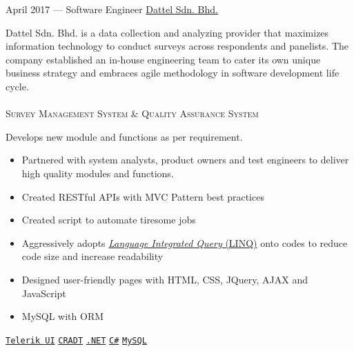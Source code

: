 \documentclass[9pt]{developercv} %
\begin{document}



\begin{entrylist}
	\entry
		{April 2017 ---}
		{Software Engineer}
		{\href{https://www.dattel.asia/}{Dattel Sdn. Bhd.}}
		{{\footnotesize{Dattel Sdn. Bhd. is a data collection and analyzing provider that maximizes information technology to conduct surveys across respondents and panelists. The company established an in-house engineering team to cater its own unique business strategy and embraces agile methodology in software development life cycle.}} 
\\ \\
		{\textsc{Survey Management System \& Quality Assurance System}} \\
			{\small Develops new module and functions as per requirement.
			\begin{itemize}
				\item Partnered with system analysts, product owners and test engineers to deliver high quality modules and functions.
				\item Created RESTful APIs with MVC Pattern best practices
				\item Created script to automate tiresome jobs
				\item Aggressively adopts \href{https://docs.microsoft.com/en-us/dotnet/csharp/programming-guide/concepts/linq/}{\textit{Language Integrated Query} (LINQ)} onto codes to reduce code size and increase readability
				\item Designed user-friendly pages with HTML, CSS, JQuery, AJAX and JavaScript
				\item MySQL with ORM
			\end{itemize}}
			\texttt{\href{https://docs.telerik.com/aspnet-mvc/introduction}{Telerik UI}}
				\slashsep
			\texttt{\href{https://cradt.wordpress.com/}{CRADT}}
				\slashsep
			\texttt{\href{https://docs.microsoft.com/en-us/dotnet/standard/index}{.NET}}
				\slashsep
			\texttt{\href{https://docs.microsoft.com/en-us/dotnet/csharp/}{C\#}}
				\slashsep
			\texttt{\href{https://www.mysql.com/}{MySQL}}
\\

}
\end{entrylist}
\end{document}
